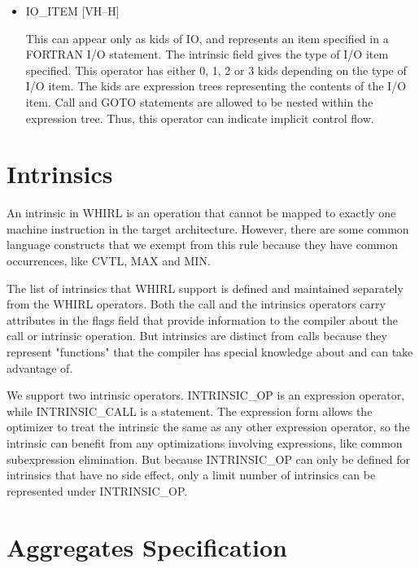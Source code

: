 \begin{itemize}
\item 
{}%
IO\_ITEM \hfill [VH--H]

This can appear only as kids of
%
IO, and represents an item specified
in a FORTRAN I/O statement. The intrinsic field gives the type of
I/O item specified. This operator has either 0, 1, 2 or 3 kids depending on
the type of I/O item. The kids are expression trees representing
the contents of the I/O item. Call and
%
GOTO statements are allowed
to be nested within the expression tree. Thus, this operator can
indicate implicit control flow.

\end{itemize}
\section{Intrinsics}

An intrinsic in WHIRL is an operation that cannot be mapped to
exactly one machine instruction in the target architecture. However,
there are some common language constructs that we exempt from this
rule because they have common occurrences, like
%
CVTL,
%
MAX and
%
MIN.

The list of intrinsics that WHIRL support is defined and maintained
separately from the WHIRL operators. Both the call and the intrinsics
operators carry attributes in the flags field that provide information
to the compiler about the call or intrinsic operation. But intrinsics
are distinct from calls because they represent "functions" that
the compiler has special knowledge about and can take advantage
of.

We support two intrinsic operators. 
%
INTRINSIC\_OP is an expression
operator, while 
%
INTRINSIC\_CALL is a statement. The expression form allows the
optimizer to treat the intrinsic the same as any other expression
operator, so the intrinsic can benefit from any optimizations
involving expressions, like common subexpression elimination. But
because 
%
INTRINSIC\_OP can only be defined for intrinsics that have
no side effect, only a limit number of intrinsics can be represented
under 
%
INTRINSIC\_OP.

\section{Aggregates Specification}

